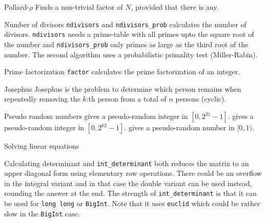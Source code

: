\begin{algorithm}{Pollard-$\rho$}
\desc
Finds a non-trivial factor of $N$, provided that there is any.
\end{algorithm}

\begin{algorithm}{Number of divisors}
\desc
{\tt ndivisors} and {\tt ndivisors\_prob} calculates
the number of divisors. {\tt ndivisors} needs a prime-table with all primes
upto the square root of the number and {\tt ndivisors\_prob} only primes as
large as the third root of the number. The second algorithm uses a
probabilistic primality test (Miller-Rabin).
\end{algorithm}

\begin{algorithm}{Prime factorization}
\desc
{\tt factor} calculates the prime factorization of an integer.
\end{algorithm}

\begin{algorithm}{Josephus}
\desc
Josephus is the problem to determine which person remains when repeatedly
removing the $k$:th person from a total of $n$ persons (cyclic).
\end{algorithm}


\begin{algorithm}{Pseudo random numbers}
 gives a pseudo-random integer in
$[0,2^{31}-1]$.
 gives a pseudo-random integer in
$[0,2^{62}-1]$.
 gives a pseudo-random number in
$[0,1)$.
\end{algorithm}

\begin{algorithm}{Solving linear equations}
\end{algorithm}

\begin{algorithm}{Calculating determinant}
 and {\tt int\_determinant} both reduces the matrix
to an upper diagonal form using elementary row operations. There could be an
overflow in the integral variant and in that case the double variant
can be used instead, rounding the answer at the end. The strength of
{\tt int\_determinant} is that it can be used for {\tt long long} or
{\tt BigInt}. Note that it uses {\tt euclid} which could be rather
slow in the {\tt BigInt} case.
\end{algorithm}

